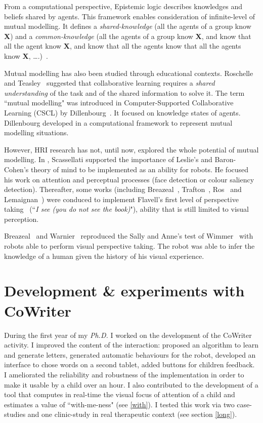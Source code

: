 \documentclass[10pt,a4paper]{article}
\begin{document}
From a computational perspective, Epistemic logic describes knowledges and beliefs shared by agents. This framework enables consideration of infinite-level of mutual modelling. It defines a \textit{shared-knowledge} (all the agents of a group know \textbf{X}) and a \textit{common-knowledge} (all the agents of a group know \textbf{X}, and know that all the agent know \textbf{X}, and know that all the agents know that all the agents know \textbf{X}, \dots.)~\cite{hendricks2008epistemic}. 

Mutual modelling has also been studied through educational contexts. Roschelle and Teasley~\cite{roschelle1995construction} suggested that collaborative learning requires a \textit{shared understanding} of the task and of the shared information to solve it. 
The term ``mutual modelling" was introduced in Computer-Supported Collaborative Learning (CSCL) by Dillenbourg~\cite{dillenbourg1999you}. It focused on knowledge states of agents. Dillenbourg developed in \cite{sangin2007partner} a computational framework to represent mutual modelling situations.

However, HRI research has not, until now, explored the whole potential of mutual modelling. In \cite{scassellati2002theory}, Scassellati supported the importance of Leslie's and Baron-Cohen's theory of mind to be implemented as an ability for robots. 
He focused his work on attention and perceptual processes (face detection or colour saliency detection). Thereafter, some works (including Breazeal~\cite{breazeal2006using}, Trafton~\cite{Trafton2005}, Ros~\cite{Ros2010} and Lemaignan~\cite{lemaignan2012thesis}) were conduced to implement Flavell's first level of perspective taking~\cite{flavell1977development} (``\textit{I see (you do not see the book)}"), ability that is still limited to visual perception. 

Breazeal~\cite{breazeal2009embodied} and Warnier~\cite{warnier2012when} reproduced the Sally and Anne's test of Wimmer~\cite{wimmer1983beliefs} with robots able to perform visual perspective taking. The robot was able to infer the knowledge of a human given the history of his visual experience.



\section{Development \& experiments with CoWriter}\label{year}
During the first year of my \textit{Ph.D.} I worked on the development of the CoWriter activity. 
I improved the content of the interaction: proposed an algorithm to learn and generate letters, generated automatic behaviours for the robot, developed an interface to chose words on a second tablet, added buttons for children feedback. 
I ameliorated the reliability and robustness of the implementation in order to make it usable by a child over an hour.
I also contributed to the development of a tool that computes in real-time the visual focus of attention of a child and estimates a value of ``with-me-ness" (see \ref{with}). 
I tested this work via two case-studies and one clinic-study in real therapeutic context (see section \ref{long}). 
\end{document}

